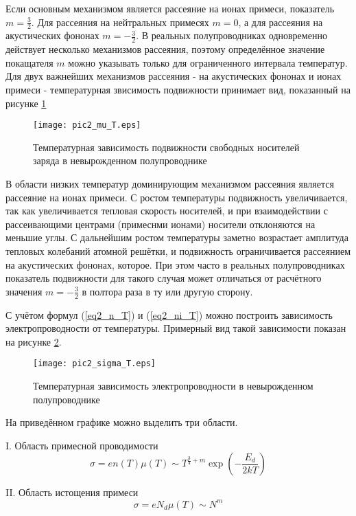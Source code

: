 Если основным механизмом является рассеяние на ионах примеси, показатель $m = \frac{3}{2}$. Для рассеяния на нейтральных примесях $m = 0$, а для рассеяния на акустических фононах $m = -\frac{3}{2}$. В реальных полупроводниках одновременно действует несколько механизмов рассеяния, поэтому определённое значение покащателя $m$ можно указывать только для ограниченного интервала температур. Для двух важнейших механизмов рассеяния - на акустических фононах и ионах примеси - температурная звисимость подвижности принимает вид, показанный на рисунке \ref{pic2_mu_T}

\begin{figure}[h!]\centering
\texttt{[image: pic2\_mu\_T.eps]}
\caption{Температурная зависимость подвижности свободных носителей заряда в невырожденном полупроводнике}
\label{pic2_mu_T}
\end{figure}

В области низких температур доминирующим механизмом рассеяния является рассеяние на ионах примеси. С ростом температуры подвижность увеличивается, так как увеличивается тепловая скорость носителей, и при взаимодействии с рассеивающими центрами (примеснми ионами) носители отклоняются на меньшие углы. С дальнейшим ростом температуры заметно возрастает амплитуда тепловых колебаний атомной решётки, и подвижность ограничивается рассеянием на акустических фононах, которое. При этом часто в реальных полупроводниках показатель подвижности для такого случая может отличаться от расчётного значения $m = -\frac{3}{2}$ в полтора раза в ту или другую сторону.

С учётом формул (\ref{eq2_n_T}) и (\ref{eq2_ni_T}) можно построить зависимость электропроводности от температуры. Примерный вид такой зависимости показан на рисунке \ref{pic2_sigma_T}.

\begin{figure}[h!]\centering
\texttt{[image: pic2\_sigma\_T.eps]}
\caption{Температурная зависимость электропроводности в невырожденном полупроводнике}
\label{pic2_sigma_T}
\end{figure}

На приведённом графике можно выделить три области.

I. Область примесной проводимости
\begin{equation}
\sigma = e n(T) \mu(T) \sim T^{\frac{3}{4} + m} \exp{\left( -\frac{E_{d}}{2 k T} \right)}
\end{equation}

II. Область истощения примеси
\begin{equation}
\sigma = e N_{d} \mu(T) \sim N^{m}
\end{equation}

